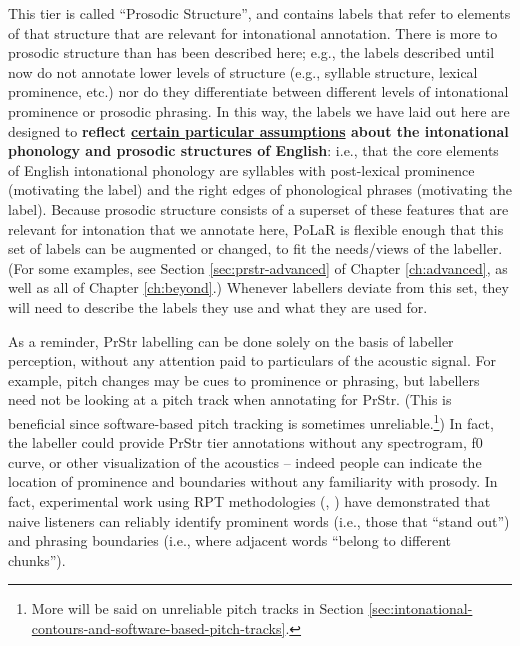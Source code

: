 \begin{infobox}[frametitle=\textbf{A side-note about this tier}]
This tier is called “Prosodic Structure”, and contains labels that refer to elements of that structure that are relevant for intonational annotation. There is more to prosodic structure than has been described here; e.g., the labels described until now do not annotate lower levels of structure (e.g., syllable structure, lexical prominence, etc.) nor do they differentiate between different levels of intonational prominence or prosodic phrasing. In this way, the labels we have laid out here are designed to \textbf{reflect \uline{certain particular assumptions} about the intonational phonology and prosodic structures of English}: i.e., that the core elements of English intonational phonology are syllables with post-lexical prominence (motivating the \textlabel{*} label) and the right edges of phonological phrases (motivating the \textlabel{]} label). Because prosodic structure consists of a superset of these features that are relevant for intonation that we annotate here, PoLaR is flexible enough that this set of labels can be augmented or changed, to fit the needs\slash views of the labeller. (For some examples, see Section \ref{sec:prstr-advanced} of Chapter \ref{ch:advanced}, as well as all of Chapter \ref{ch:beyond}.) Whenever labellers deviate from this set, they will need to describe the labels they use and what they are used for.
\end{infobox}

As a reminder, PrStr labelling can be done solely on the basis of labeller perception, without any attention paid to particulars of the acoustic signal. For example, pitch changes may be cues to prominence or phrasing, but labellers need not be looking at a pitch track when annotating for PrStr. (This is beneficial since software-based pitch tracking is sometimes unreliable.\footnote{More will be said on unreliable pitch tracks in Section \ref{sec:intonational-contours-and-software-based-pitch-tracks}.}) In fact, the labeller could provide PrStr tier annotations without any spectrogram, f0 curve, or other visualization of the acoustics – indeed people can indicate the location of prominence and boundaries without any familiarity with prosody. In fact, experimental work using RPT methodologies (\citealt{cole-14, cole-17}, \citealt{cole-16}) have demonstrated that naive listeners can reliably identify prominent words (i.e., those that “stand out”) and phrasing boundaries (i.e., where adjacent words “belong to different chunks”).

